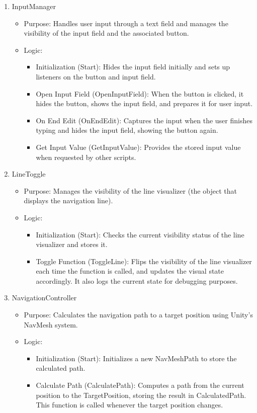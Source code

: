 \documentclass[11pt]{article}
\begin{document}
\begin{multicols}{2}
\begin{enumerate}
	    \item InputManager
	    \begin{itemize}
	        \item Purpose: Handles user input through a text field and manages the visibility of the input field and the associated button.
	        \item Logic:
	        \begin{itemize}
	            \item Initialization (Start): Hides the input field initially and sets up listeners on the button and input field.
	            \item Open Input Field (OpenInputField): When the button is clicked, it hides the button, shows the input field, and prepares it for user input.
	            \item On End Edit (OnEndEdit): Captures the input when the user finishes typing and hides the input field, showing the button again.
	            \item Get Input Value (GetInputValue): Provides the stored input value when requested by other scripts.
	        \end{itemize}
	    \end{itemize}
	
	    \item LineToggle
	    \begin{itemize}
	        \item Purpose: Manages the visibility of the line visualizer (the object that displays the navigation line).
	        \item Logic:
	        \begin{itemize}
	            \item Initialization (Start): Checks the current visibility status of the line visualizer and stores it.
	            \item Toggle Function (ToggleLine): Flips the visibility of the line visualizer each time the function is called, and updates the visual state accordingly. It also logs the current state for debugging purposes.
	        \end{itemize}
	    \end{itemize}
	
	    \item NavigationController
	    \begin{itemize}
	        \item Purpose: Calculates the navigation path to a target position using Unity’s NavMesh system.
	        \item Logic:
	        \begin{itemize}
	            \item Initialization (Start): Initializes a new NavMeshPath to store the calculated path.
	            \item Calculate Path (CalculatePath): Computes a path from the current position to the TargetPosition, storing the result in CalculatedPath. This function is called whenever the target position changes.
	        \end{itemize}
	    \end{itemize}
	

\end{enumerate}
\end{multicols}
\end{document}
